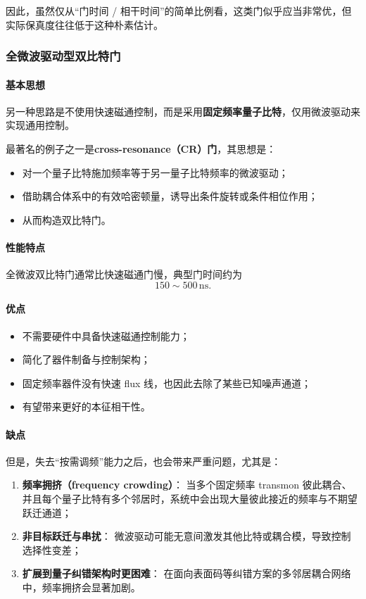 \documentclass[12pt,a4paper,oneside]{ctexbook}
\begin{document}
因此，虽然仅从“门时间 / 相干时间”的简单比例看，这类门似乎应当非常优，但实际保真度往往低于这种朴素估计。

\subsubsection{全微波驱动型双比特门}

\paragraph{基本思想}
另一种思路是不使用快速磁通控制，而是采用\textbf{固定频率量子比特}，仅用微波驱动来实现通用控制。

最著名的例子之一是\textbf{cross-resonance（CR）门}，其思想是：
\begin{itemize}
    \item 对一个量子比特施加频率等于另一量子比特频率的微波驱动；
    \item 借助耦合体系中的有效哈密顿量，诱导出条件旋转或条件相位作用；
    \item 从而构造双比特门。
\end{itemize}

\paragraph{性能特点}
全微波双比特门通常比快速磁通门慢，典型门时间约为
\[
150\sim 500\,\mathrm{ns}.
\]

\paragraph{优点}
\begin{itemize}
    \item 不需要硬件中具备快速磁通控制能力；
    \item 简化了器件制备与控制架构；
    \item 固定频率器件没有快速 flux 线，也因此去除了某些已知噪声通道；
    \item 有望带来更好的本征相干性。
\end{itemize}

\paragraph{缺点}
但是，失去“按需调频”能力之后，也会带来严重问题，尤其是：

\begin{enumerate}
    \item \textbf{频率拥挤（frequency crowding）}：
    当多个固定频率 transmon 彼此耦合、并且每个量子比特有多个邻居时，系统中会出现大量彼此接近的频率与不期望跃迁通道；

    \item \textbf{非目标跃迁与串扰}：
    微波驱动可能无意间激发其他比特或耦合模，导致控制选择性变差；

    \item \textbf{扩展到量子纠错架构时更困难}：
    在面向表面码等纠错方案的多邻居耦合网络中，频率拥挤会显著加剧。
\end{enumerate}
\end{document}
